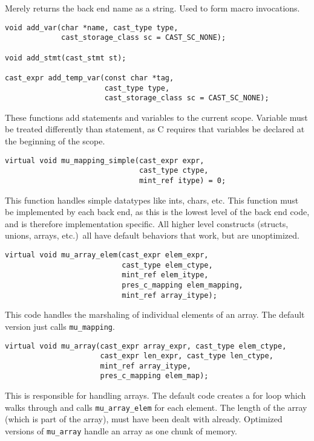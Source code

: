 Merely returns the back end name as a string.  Used to form macro invocations.

\begin{verbatim}
void add_var(char *name, cast_type type,
             cast_storage_class sc = CAST_SC_NONE);

void add_stmt(cast_stmt st);

cast_expr add_temp_var(const char *tag,
                       cast_type type,
                       cast_storage_class sc = CAST_SC_NONE);
\end{verbatim}

These functions add statements and variables to the current scope.  Variable
must be treated differently than statement, as C requires that variables be
declared at the beginning of the scope.

\begin{verbatim}
virtual void mu_mapping_simple(cast_expr expr,
                               cast_type ctype,
                               mint_ref itype) = 0;
\end{verbatim}

This function handles simple datatypes like ints, chars, etc.  This function
must be implemented by each back end, as this is the lowest level of the back
end code, and is therefore implementation specific.  All higher level
constructs (structs, unions, arrays, etc.)\ all have default behaviors that
work, but are unoptimized.

\begin{verbatim}
virtual void mu_array_elem(cast_expr elem_expr,
                           cast_type elem_ctype,
                           mint_ref elem_itype,
                           pres_c_mapping elem_mapping,
                           mint_ref array_itype);
\end{verbatim}

This code handles the marshaling of individual elements of an array.  The
default version just calls \texttt{mu\_mapping}.

\begin{verbatim}
virtual void mu_array(cast_expr array_expr, cast_type elem_ctype,
                      cast_expr len_expr, cast_type len_ctype,
                      mint_ref array_itype,
                      pres_c_mapping elem_map);
\end{verbatim}

This is responsible for handling arrays.  The default code creates a for loop
which walks through and calls \texttt{mu\_array\_elem} for each element.  The
length of the array (which is part of the array), must have been dealt with
already.  Optimized versions of \texttt{mu\_array} handle an array as one chunk
of memory.

